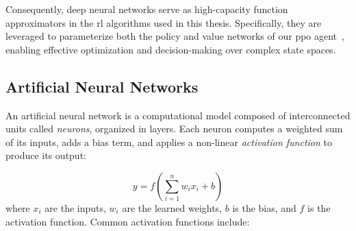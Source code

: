 Consequently, deep neural networks serve as high-capacity function approximators in the \gls{rl} algorithms used in this thesis. Specifically, they are leveraged to parameterize both the policy and value networks of our \gls{ppo} agent~\cite{schulman2017ppo}, enabling effective optimization and decision-making over complex state spaces.

\subsection{Artificial Neural Networks}

An artificial neural network is a computational model composed of interconnected units called \textit{neurons}, organized in layers. Each neuron computes a weighted sum of its inputs, adds a bias term, and applies a non-linear \textit{activation function} to produce its output:

\begin{equation}
    y = f\left(\sum_{i=1}^{n} w_i x_i + b\right)
\end{equation}
where $x_i$ are the inputs, $w_i$ are the learned weights, $b$ is the bias, and $f$ is the activation function. Common activation functions include:

